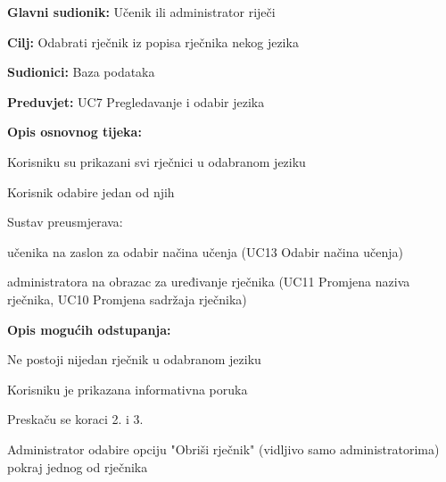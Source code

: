 \noindent {}
\begin{packed_item}

	\item \textbf{Glavni sudionik: } Učenik ili administrator riječi
	\item \textbf{Cilj: } Odabrati rječnik iz popisa rječnika nekog jezika
	\item \textbf{Sudionici: } Baza podataka
	\item \textbf{Preduvjet: } UC7 Pregledavanje i odabir jezika
	\item  \textbf{Opis osnovnog tijeka:}
	
	\item[] \begin{packed_enum}
		
		\item Korisniku su prikazani svi rječnici u odabranom jeziku
		\item Korisnik odabire jedan od njih
		\item Sustav preusmjerava:
		\item[] \begin{packed_item}
		
			\item učenika na zaslon za odabir načina učenja (UC13 Odabir načina učenja)
			\item administratora na obrazac za uređivanje rječnika (UC11 Promjena naziva rječnika, UC10 Promjena sadržaja rječnika)
			
		\end{packed_item}

	\end{packed_enum}

	\item  \textbf{Opis mogućih odstupanja:}
	
	\item[] \begin{packed_item}

		\item[1.a] Ne postoji nijedan rječnik u odabranom jeziku
		\item[] \begin{packed_enum}
			
			\item Korisniku je prikazana informativna poruka
			\item Preskaču se koraci 2. i 3.
			
		\end{packed_enum}
		\item[2.a] Administrator odabire opciju "Obriši rječnik" (vidljivo samo administratorima) pokraj jednog od rječnika
		\item[] \begin{packed_enum}
			

\end{packed_enum}
\end{packed_item}
\end{packed_item}
